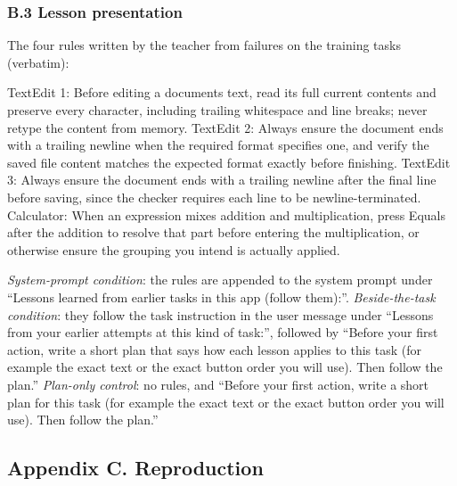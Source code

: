 \documentclass[
  10pt,
]{article}
\newenvironment{Shaded}{}{}
\newcommand{\NormalTok}[1]{#1}
\begin{document}
\subsubsection{B.3 Lesson presentation}\label{b.3-lesson-presentation}

The four rules written by the teacher from failures on the training
tasks (verbatim):

\begin{Shaded}
\begin{Highlighting}[]
\NormalTok{TextEdit 1: Before editing a document\textquotesingle{}s text, read its full current contents and preserve}
\NormalTok{  every character, including trailing whitespace and line breaks; never retype the content}
\NormalTok{  from memory.}
\NormalTok{TextEdit 2: Always ensure the document ends with a trailing newline when the required format}
\NormalTok{  specifies one, and verify the saved file content matches the expected format exactly}
\NormalTok{  before finishing.}
\NormalTok{TextEdit 3: Always ensure the document ends with a trailing newline after the final line}
\NormalTok{  before saving, since the checker requires each line to be newline{-}terminated.}
\NormalTok{Calculator: When an expression mixes addition and multiplication, press Equals after the}
\NormalTok{  addition to resolve that part before entering the multiplication, or otherwise ensure}
\NormalTok{  the grouping you intend is actually applied.}
\end{Highlighting}
\end{Shaded}

\emph{System-prompt condition}: the rules are appended to the system
prompt under ``Lessons learned from earlier tasks in this app (follow
them):''. \emph{Beside-the-task condition}: they follow the task
instruction in the user message under ``Lessons from your earlier
attempts at this kind of task:'', followed by ``Before your first
action, write a short plan that says how each lesson applies to this
task (for example the exact text or the exact button order you will
use). Then follow the plan.'' \emph{Plan-only control}: no rules, and
``Before your first action, write a short plan for this task (for
example the exact text or the exact button order you will use). Then
follow the plan.''

\subsection{Appendix C. Reproduction}\label{appendix-c.-reproduction}
\end{document}
